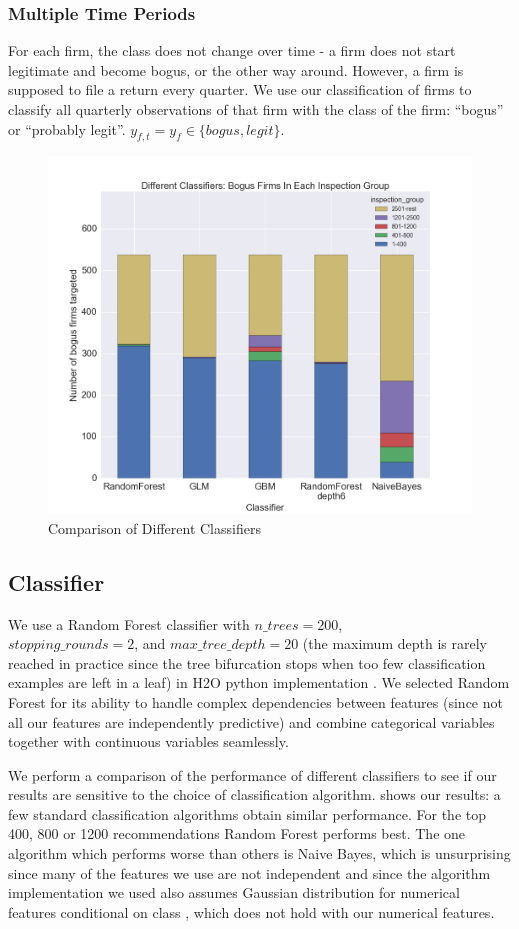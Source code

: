 \subsubsection{Multiple Time Periods}
\label{subsubsec:multiple-time}
For each firm, the class does not change over time - a firm does not start legitimate and become bogus, or the other way around. However, a firm is supposed to file a return every quarter. We use our classification of firms to classify all quarterly observations of that firm with the class of the firm: ``bogus'' or ``probably legit''. $y_{f,t}=y_f \in \{bogus,legit\}$.

\begin{figure}[t!]
  \includegraphics[width=.6\textwidth]{graphs/DifferentClassifiersPerformanceByInspectionGroup.png}
  \caption{Comparison of Different Classifiers}
  \label{fig:differentclassifiers}
\end{figure}

\subsection{Classifier}
\label{subsec:classifier}
We use a Random Forest \cite{liaw2002classification} classifier with $n\_trees=200$,\\ $stopping\_rounds=2$, and $max\_tree\_depth=20$ (the maximum depth is rarely reached in practice since the tree bifurcation stops when too few classification examples are left in a leaf) in H2O python implementation \cite{h2o_Python_module}. We selected Random Forest for its ability to handle complex dependencies between features (since not all our features are independently predictive) and combine categorical variables together with continuous variables seamlessly. 

We perform a comparison of the performance of different classifiers to see if our results are sensitive to the choice of classification algorithm.  shows our results: a few  standard classification algorithms obtain similar performance. For the top 400, 800 or 1200 recommendations Random Forest performs best. The one algorithm which performs worse than others is Naive Bayes, which is unsurprising since many of the features we use are not independent and since the algorithm implementation we used also assumes Gaussian distribution for numerical features conditional on class \cite{h2o_NaiveBayes}, which does not hold with our numerical features.

